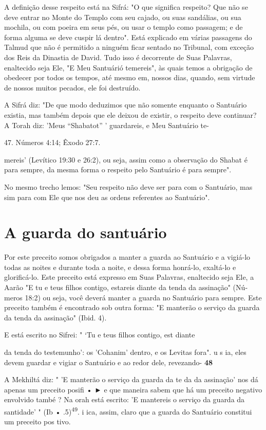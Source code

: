 A definição desse respeito está na Sifrá: "O que significa respeito? Que
não se deve entrar no Monte do Templo com seu cajado, ou suas
sandá­lias, ou sua mochila, ou com poeira em seus pés, ou usar o templo
como passa­gem; e de forma alguma se deve cuspir lá dentro". Está
explicado em várias passagens do Talmud que não é permitido a ninguém
ficar sentado no Tribu­nal, com exceção dos Reis da Dinastia de David.
Tudo isso é decorrente de Suas Palavras, enaltecido seja Ele, "E Meu
Santuárió temereis", às quais temos a obri­gação de obedecer por todos
os tempos, até mesmo em, nossos dias, quando, sem virtude de nossos
muitos pecados, ele foi destruído.

A Sifrá diz: "De que modo deduzimos que não somente enquanto o Santuário
existia, mas também depois que ele deixou de existir, o respeito deve
continuar? A Torah diz: 'Meus ``Shabatot'' ' guardareis, e Meu Santuário
te-

47. Números 4:14; Êxodo 27:7.

mereis' (Levítico 19:30 e 26:2), ou seja, assim como a observação do
Shabat é para sempre, da mesma forma o respeito pelo Santuário é para
sempre".

No mesmo trecho lemos: "Seu respeito não deve ser para com o San­tuário,
mas sim para com Ele que nos deu as ordens referentes ao Santuário".

\section{A guarda do santuário}

Por este preceito somos obrigados a manter a guarda ao Santuário e a
vigiá-lo todas as noites e durante toda a noite, e dessa forma honrá-lo,
exaltá-lo e glorificá-lo. Este preceito está expresso em Suas Palavras,
enaltecido seja Ele, a Aarão "E tu e teus filhos contigo, estareis
diante da tenda da assinação" (Nú­meros 18:2) ou seja, você deverá
manter a guarda no Santuário para sempre. Este preceito também é
encontrado sob outra forma: "E manterão o serviço da guarda da tenda da
assinação" (Ibid. 4).

E está escrito no Sifrei: " `Tu e teus filhos contigo, est diante

da tenda do testemunho': os 'Cohanim' dentro, e os Levitas fora". u s
ia, eles devem guardar e vigiar o Santuário e ao redor dele, revezando-
\textbf{48}

A Mekhiltá diz: " 'E manterão o serviço da guarda da te da da
assi­nação' nos dá apenas um preceito posifi • ► e que maneira sabem que
há um preceito negativo envolvido també ? Na orah está escrito: 'E
mantereis o serviço da guarda da santidade' " (Ib •
.5)\textsuperscript{49}. i ica, assim, claro que a guarda do Santuário
constitui um preceito pos tivo.

